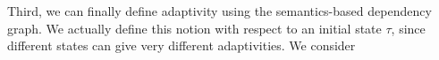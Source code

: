 %
Third, we can finally define adaptivity using the semantics-based dependency graph. We actually define this notion with respect to an initial state $\tau$, since different states can give very different adaptivities.  
We consider 
